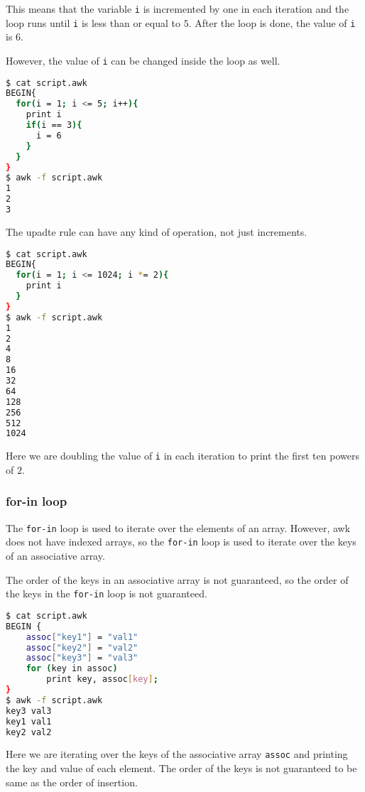 This means that the variable \lstinline|i| is incremented by one in each iteration and the loop runs until \lstinline|i| is less than or equal to $5$.
After the loop is done, the value of \lstinline|i| is $6$.

However, the value of \lstinline|i| can be changed inside the loop as well.

\begin{lstlisting}[language=bash]
$ cat script.awk
BEGIN{
  for(i = 1; i <= 5; i++){
    print i
    if(i == 3){
      i = 6
    }
  }
}
$ awk -f script.awk
1
2
3
\end{lstlisting}

The upadte rule can have any kind of operation, not just increments.

\begin{lstlisting}[language=bash]
$ cat script.awk
BEGIN{
  for(i = 1; i <= 1024; i *= 2){
    print i
  }
}
$ awk -f script.awk
1
2
4
8
16
32
64
128
256
512
1024
\end{lstlisting}

Here we are doubling the value of \lstinline|i| in each iteration to print the first ten powers of $2$.


\subsubsection{for-in loop}

The \lstinline|for-in| loop is used to iterate over the elements of an array. 
However, awk does not have indexed arrays, so the \lstinline|for-in| loop is used to iterate over the keys of an associative array.

\begin{remark}
  The order of the keys in an associative array is not guaranteed, so the order of the keys in the \lstinline|for-in| loop is not guaranteed.
\end{remark}

\begin{lstlisting}[language=bash]
$ cat script.awk
BEGIN {
    assoc["key1"] = "val1"
    assoc["key2"] = "val2"
    assoc["key3"] = "val3"
    for (key in assoc)
        print key, assoc[key];
}
$ awk -f script.awk
key3 val3
key1 val1
key2 val2
\end{lstlisting}

Here we are iterating over the keys of the associative array \lstinline|assoc| and printing the key and value of each element.
The order of the keys is not guaranteed to be same as the order of insertion.


